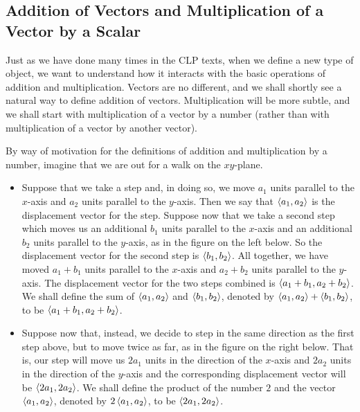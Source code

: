 \subsection{Addition of Vectors and Multiplication of a Vector by a Scalar}

Just as we have done many times in the CLP texts, when we define a new 
type of object, we want to understand how it interacts with the basic 
operations of addition and multiplication. Vectors are no different, and 
we shall shortly see a natural way to define addition of vectors.
Multiplication will be more subtle, and we shall start with multiplication of a vector by a number (rather than with multiplication of a vector by 
another vector).

By way of motivation for the definitions of addition and multiplication by a number, imagine that we are out for a walk on the $xy$-plane. 
\begin{itemize}
\item 
Suppose that we take a step and, in doing so, we move $a_1$ units parallel to the $x$-axis and $a_2$ units parallel to the $y$-axis. 
Then we say that $\left< a_1, a_2\right>$ is the displacement vector for the step. Suppose now that we take a second step which moves us an additional $b_1$ units  parallel to the $x$-axis and an additional $b_2$ units  parallel to the $y$-axis, as in the figure on the left below. So the displacement 
vector for the second step is $\left< b_1, b_2\right>$. All together, we have moved $a_1+b_1$ units  parallel to the $x$-axis and $a_2+b_2$ units parallel to the $y$-axis. The displacement vector for the two steps combined is  
$\left< a_1+b_1, a_2+b_2\right>$. We shall define
the sum of $\left< a_1, a_2\right>$ and $\left< b_1, b_2\right>$, denoted by
$\left< a_1, a_2\right>+\left< b_1,b_2\right>$, to be $\left< a_1+b_1, a_2+b_2\right>$.

\item
Suppose now that, instead, we decide to step in the same direction
as the first step above, but to move twice as far, as in the figure on the right below. That is, our step will move us $2a_1$ units in the direction of the $x$-axis and $2a_2$ units in the direction of the $y$-axis and the 
corresponding displacement vector will be $\left< 2a_1, 2a_2\right>$. 
We shall define the product of the number $2$ and the vector
$\left< a_1, a_2\right>$, denoted by $2\left< a_1, a_2\right>$, to be 
$\left< 2a_1, 2a_2\right>$.
\end{itemize}

